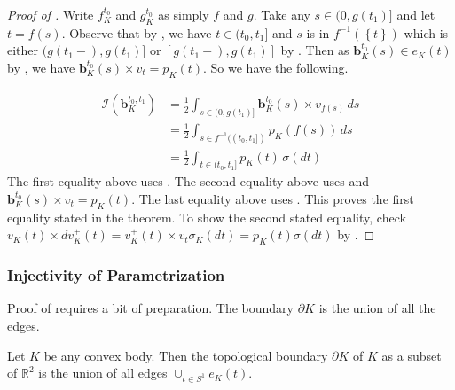 \begin{proof}[Proof of ]
Write \(f_K^{t_0}\) and \(g_K^{t_0}\) as simply \(f\) and \(g\). Take any \(s \in (0, g(t_1)]\) and let \(t = f(s)\). Observe that by , we have \(t \in (t_0, t_1]\) and \(s\) is in \(f^{-1}(\left\{ t \right\})\) which is either \((g(t_1 -), g(t_1)]\) or \([g(t_1 -), g(t_1)]\) by . Then as \(\mathbf{b}_{K}^{t_0} (s) \in e_K(t)\) by , we have \(\mathbf{b}_{K}^{t_0} (s) \times v_{t} = p_K(t)\). So we have the following.

\begin{align*}
\mathcal{I} \left( \mathbf{b}_{K}^{t_0, t_1} \right) & = \frac{1}{2} \int_{s \in (0, g(t_1)]} \mathbf{b}_{K}^{t_0} (s) \times v_{f(s)} \, ds \\
& = \frac{1}{2} \int_{s \in f^{-1}((t_0, t_1])} p_K(f(s)) \, ds \\
& = \frac{1}{2} \int_{t \in(t_0, t_1]} p_K(t) \, \sigma(dt)
\end{align*}
The first equality above uses . The second equality above uses  and \(\mathbf{b}_{K}^{t_0} (s) \times v_{t} = p_K(t)\). The last equality above uses . This proves the first equality stated in the theorem. To show the second stated equality, check \(v_K(t) \times dv_K^+(t) = v_K^+(t) \times v_{t} \sigma_K(dt) = p_K(t) \sigma(dt)\) by .
\end{proof}

\subsubsection{Injectivity of Parametrization}

Proof of  requires a bit of preparation. The boundary \(\partial K\) is the union of all the edges.

\begin{theorem}

Let \(K\) be any convex body. Then the topological boundary \(\partial K\) of \(K\) as a subset of \(\mathbb{R}^2\) is the union of all edges \(\cup_{t \in S^1} e_K(t)\).

\label{thm:boundary-is-union-all-edges}
\end{theorem}

